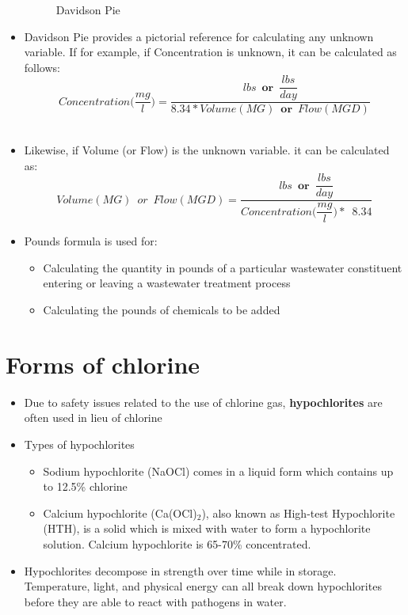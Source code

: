 \documentclass{article}
\begin{document}
\begin{itemize}
\begin{figure}[h]
\caption{Davidson Pie}
\end{figure}
\vspace{0.2cm}
\item Davidson Pie provides a pictorial reference for calculating any unknown variable.  If for example, if Concentration is unknown, it can be calculated as follows: \\$$Concentration\Big(\dfrac{mg}{l}\Big)=\dfrac{lbs \enspace \textbf{or} \enspace \dfrac{lbs}{day}}{8.34*Volume(MG) \enspace \textbf{or} \enspace Flow (MGD)}$$\\
\vspace{0.2cm}
\item Likewise, if Volume (or Flow) is the unknown variable. it can be calculated as:  \\$$Volume (MG) \enspace or \enspace Flow(MGD)=\dfrac{lbs \enspace \textbf{or} \enspace \dfrac{lbs}{day}}{Concentration\Big(\dfrac{mg}{l}\Big)* \enspace 8.34  }$$
\vspace{0.2cm}
\item Pounds formula is used for:
\begin{itemize}
\item Calculating the quantity in pounds of a particular wastewater constituent entering or leaving a wastewater treatment process
\item Calculating the pounds of chemicals to be added\\
\end{itemize}
\end{itemize}
\section*{Forms of chlorine}

\begin{itemize}
	\item Due to safety issues related to the use of chlorine gas, \textbf{hypochlorites} are often used in lieu of chlorine
	\item Types of hypochlorites
	\begin{itemize}
	\item Sodium hypochlorite (NaOCl) comes in a liquid form which contains up to 12.5\% chlorine
	\item Calcium hypochlorite (Ca(OCl)$_2$), also known as High-test Hypochlorite (HTH), is a solid which is mixed with water to form a hypochlorite solution. Calcium hypochlorite is 65-70\% concentrated.
	\end{itemize}
	\item Hypochlorites decompose in strength over time while in storage. Temperature, light, and physical energy can all break down hypochlorites before they are able to react with pathogens in water. 

\end{itemize} 
\end{document}

